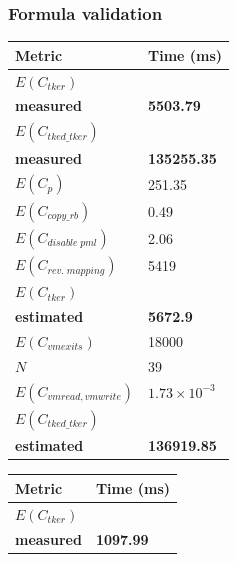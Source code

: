 \documentclass[xcolor=table,bigger,unknownkeysallowed]{beamer}
\begin{document}
        \begin{frame}
                \frametitle{Formula validation}
\begin{table}[h]
	\centering \scriptsize
	\begin{subtable}[b]{.45\textwidth}
		\centering 
		\begin{tabular}{l l}
			\toprule
			\hline
			Metric & Time (ms) \\
			\hline
			\textcolor{americanrose}{\textbf{$E(C_{tker})$}} & \\
			\textcolor{americanrose}{\textbf{measured}} & \multirow{-2}{*}{\textcolor{americanrose}{\textbf{5503.79}}}\\
			\textcolor{airforceblue}{\textbf{$E(C_{tked\_tker})$}} & \\
			\textcolor{airforceblue}{\textbf{measured}} & \multirow{-2}{*}{\textcolor{airforceblue}{\textbf{135255.35}}}\\
			\midrule
			$E(C_{p})$ & 251.35\\
			$E(C_{copy\_rb})$ & 0.49\\
			$E(C_{disable \; pml})$ & 2.06\\
			$E(C_{rev. \; mapping})$ & 5419 \\
			\textcolor{americanrose}{\textbf{$E(C_{tker})$}}  &\\
			\textcolor{americanrose}{\textbf{estimated}} &  \multirow{-2}{*}{\textcolor{americanrose}{\textbf{5672.9}}}\\
			\midrule
			$E(C_{vmexits})$ & 18000\\
			$N$ & 39\\
			$E(C_{vmread,vmwrite})$ & $1.73 \times 10^{-3}$\\
			\textcolor{airforceblue}{\textbf{$E(C_{tked\_tker})$}}  & \\
			\textcolor{airforceblue}{\textbf{estimated}} & \multirow{-2}{*}{\textcolor{airforceblue}{\textbf{136919.85}}}\\
			\bottomrule
		\end{tabular}
		\label{tab:criu-spml-formula}
	\end{subtable}
	\hfill
	\begin{subtable}[b]{.45\textwidth}
		\centering 
		\begin{tabular}{l l}
			\toprule
			\hline
			Metric & Time (ms) \\
			\hline
			\textcolor{americanrose}{\textbf{$E(C_{tker})$}} & \\
			\textcolor{americanrose}{\textbf{measured}} & \multirow{-2}{*}{\textcolor{americanrose}{\textbf{1097.99}}}\\

\end{tabular}
\end{subtable}
\end{table}
\end{frame}
\end{document}
